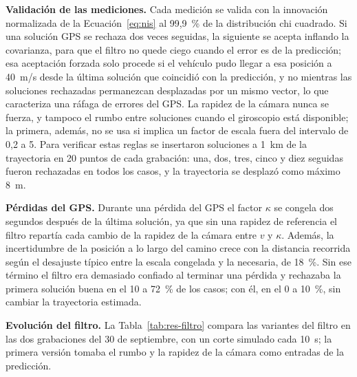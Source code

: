 \textbf{Validación de las mediciones.}
Cada medición se valida con la innovación normalizada de la Ecuación~\eqref{eq:nis} al 99,9~\% de la distribución chi cuadrado.
Si una solución GPS se rechaza dos veces seguidas, la siguiente se acepta inflando la covarianza, para que el filtro no quede ciego cuando el error es de la predicción; esa aceptación forzada solo procede si el vehículo pudo llegar a esa posición a 40~m/s desde la última solución que coincidió con la predicción, y no mientras las soluciones rechazadas permanezcan desplazadas por un mismo vector, lo que caracteriza una ráfaga de errores del GPS.
La rapidez de la cámara nunca se fuerza, y tampoco el rumbo entre soluciones cuando el giroscopio está disponible; la primera, además, no se usa si implica un factor de escala fuera del intervalo de 0,2 a 5.
Para verificar estas reglas se insertaron soluciones a 1~km de la trayectoria en 20 puntos de cada grabación: una, dos, tres, cinco y diez seguidas fueron rechazadas en todos los casos, y la trayectoria se desplazó como máximo 8~m.

\textbf{Pérdidas del GPS.}
Durante una pérdida del GPS el factor $\kappa$ se congela dos segundos después de la última solución, ya que sin una rapidez de referencia el filtro repartía cada cambio de la rapidez de la cámara entre $v$ y $\kappa$.
Además, la incertidumbre de la posición a lo largo del camino crece con la distancia recorrida según el desajuste típico entre la escala congelada y la necesaria, de 18~\%.
Sin ese término el filtro era demasiado confiado al terminar una pérdida y rechazaba la primera solución buena en el 10 a 72~\% de los casos; con él, en el 0 a 10~\%, sin cambiar la trayectoria estimada.

\textbf{Evolución del filtro.}
La Tabla~\ref{tab:res-filtro} compara las variantes del filtro en las dos grabaciones del 30 de septiembre, con un corte simulado cada 10~s; la primera versión tomaba el rumbo y la rapidez de la cámara como entradas de la predicción.

